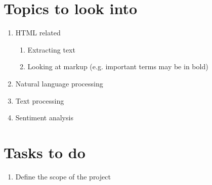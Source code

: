 \documentclass[11pt,a4paper]{article}
\begin{document}
\section{Topics to look into}
\begin{enumerate}[itemsep = -1ex]
\item HTML related
 \begin{enumerate}
 \item Extracting text
 \item Looking at markup (e.g. important terms may be in bold)
 \end{enumerate}
\item Natural language processing
\item Text processing
\item Sentiment analysis
\end{enumerate}

\section{Tasks to do}
\begin{enumerate}
\item Define the scope of the project
\end{enumerate}
\end{document}
